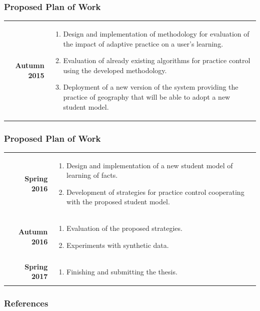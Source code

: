 \documentclass[xcolor=svgnames]{beamer}
\begin{document}
\begin{frame}
\frametitle{Proposed Plan of Work}
\begin{tabularx}{\textwidth}{rX}
	\textbf{Autumn 2015} &
		\vspace{-0.5cm}
		\begin{enumerate}
			\item Design and implementation of methodology for evaluation of the impact
				of adaptive practice on a user's learning.
			\item Evaluation of already existing algorithms for practice control using the
				developed methodology.
			\item Deployment of a new version of the system providing the practice of
				geography that will be able to adopt a new student model.
		\end{enumerate}
\end{tabularx}
\end{frame}
\begin{frame}
\frametitle{Proposed Plan of Work}
\begin{tabularx}{\textwidth}{rX}
	\textbf{Spring 2016} &
		\vspace{-0.5cm}
		\begin{enumerate}
			\item Design and implementation of a new student model of learning of
				facts.
			\item Development of strategies for practice control cooperating with the
				proposed student model.
		\end{enumerate}\\
	\textbf{Autumn 2016} &
		\vspace{-0.5cm}
		\begin{enumerate}
			\item Evaluation of the proposed strategies.
			\item Experiments with synthetic data.
		\end{enumerate}\\
	\textbf{Spring 2017} &
		\vspace{-0.5cm}
		\begin{enumerate}
			\item Finishing and submitting the thesis.
		\end{enumerate}
\end{tabularx}
\end{frame}
\begin{frame}[t,allowframebreaks]
	\frametitle{References}
	\printbibliography[notcategory=fullcited]
\end{frame}
\end{document}
